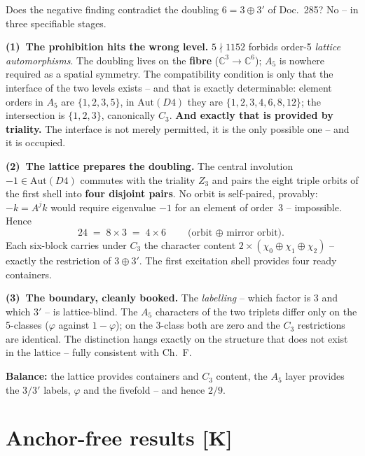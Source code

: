 \documentclass[11pt]{report}
\begin{document}
Does the negative finding contradict the doubling $6 = 3\oplus3'$ of
Doc.~285? No -- in three specifiable stages.

\textbf{(1)~The prohibition hits the wrong level.} $5\nmid1152$
forbids order-5 \emph{lattice automorphisms}. The doubling lives on
the \textbf{fibre} ($\mathbb{C}^3\to\mathbb{C}^6$); $A_5$ is nowhere
required as a spatial symmetry. The compatibility condition is only
that the interface of the two levels exists -- and that is exactly
determinable: element orders in $A_5$ are $\{1,2,3,5\}$, in
$\text{Aut}(D4)$ they are $\{1,2,3,4,6,8,12\}$; the intersection is
$\{1,2,3\}$, canonically $C_3$. \textbf{And exactly that is provided
by triality.} The interface is not merely permitted, it is the only
possible one -- and it is occupied.

\textbf{(2)~The lattice prepares the doubling.} The central
involution $-1 \in \text{Aut}(D4)$ commutes with the triality $Z_3$
and pairs the eight triple orbits of the first shell into
\textbf{four disjoint pairs}. No orbit is self-paired, provably:
$-k = A^j k$ would require eigenvalue $-1$ for an element of
order~3 -- impossible. Hence
\begin{equation}
  24 \;=\; 8\times3 \;=\; 4\times6
  \qquad\text{(orbit $\oplus$ mirror orbit).}
\end{equation}
Each six-block carries under $C_3$ the character content
$2\times(\chi_0\oplus\chi_1\oplus\chi_2)$ -- exactly the restriction
of $3\oplus3'$. The first excitation shell provides four ready
containers.

\textbf{(3)~The boundary, cleanly booked.} The \emph{labelling} --
which factor is $3$ and which $3'$ -- is lattice-blind. The $A_5$
characters of the two triplets differ only on the 5-classes
($\varphi$ against $1-\varphi$); on the 3-class both are zero and
the $C_3$ restrictions are identical. The distinction hangs exactly
on the structure that does not exist in the lattice -- fully
consistent with Ch.~F.

\textbf{Balance:} the lattice provides containers and $C_3$ content,
the $A_5$ layer provides the $3/3'$ labels, $\varphi$ and the
fivefold -- and hence $2/9$.

\chapter{Anchor-free results [K]}
\end{document}
